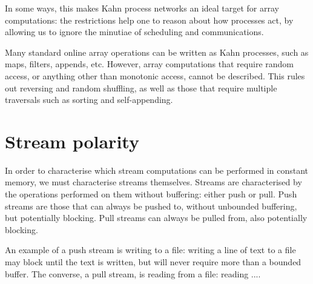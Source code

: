 In some ways, this makes Kahn process networks an ideal target for array computations: the restrictions help one to reason about how processes act, by allowing us to ignore the minutiae of scheduling and communications.

Many standard online array operations can be written as Kahn processes, such as maps, filters, appends, etc.
However, array computations that require random access, or anything other than monotonic access, cannot be described.
This rules out reversing and random shuffling, as well as those that require multiple traversals such as sorting and self-appending.

\section{Stream polarity}

In order to characterise which stream computations can be performed in constant memory, we must characterise streams themselves.
Streams are characterised by the operations performed on them without buffering: either push or pull.
Push streams are those that can always be pushed to, without unbounded buffering, but potentially blocking.
Pull streams can always be pulled from, also potentially blocking.

An example of a push stream is writing to a file: writing a line of text to a file may block until the text is written, but will never require more than a bounded buffer.
The converse, a pull stream, is reading from a file: reading ....





\citet{kay2009you} 




